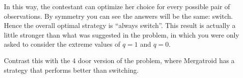 \documentclass[12pt]{article}
\begin{document}
{In this way, the contestant can optimize her choice for every possible pair of observations. By symmetry you can see the answers will be the same: switch. Hence the overall optimal strategy is ``always switch''.  This result is actually a little stronger than what was suggested in the problem, in which you were only asked to consider the extreme values of $q = 1$ and $q = 0$.

Contrast this with the $4$ door version of the problem, where Mergatroid has a strategy that performs better than switching. 
}
\end{document}
